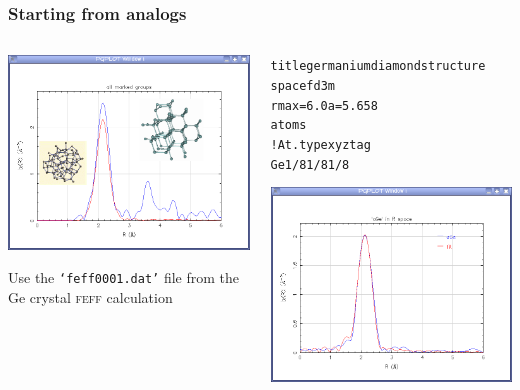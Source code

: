 \begin{frame}[fragile]
  \frametitle{Starting from analogs}
  \begin{columns}[T]
    \begin{column}{0.5\linewidth}
      \begin{center}
        \includegraphics[width=0.9\linewidth]{images/ge_chir_bns}
      \end{center}

      \bigskip

      Use the \texttt{`feff0001.dat'} file from the Ge
      crystal \textsc{feff} calculation

    \end{column}
    \begin{column}{0.5\linewidth}
      \begin{block}{}
        \begin{alltt}
          \tiny
 {\color{Green4}title germanium diamond structure}
 {\color{Brown4}space} f d 3 m
 {\color{Brown4}rmax}=6.0   {\color{Brown4}a}=5.658
 {\color{Brown4}atoms}
 {\color{Blue4}! At.type   x     y     z      tag}
    Ge      1/8   1/8   1/8
         \end{alltt}
       \end{block}

       \begin{center}
         \scriptsize
         \includegraphics[width=0.85\linewidth]{images/ge_fit}


\end{center}
\end{column}
\end{columns}
\end{frame}
